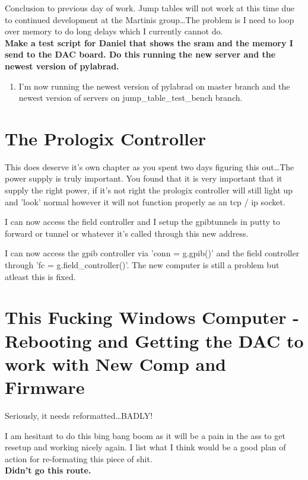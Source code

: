 \documentclass[10pt]{book}
\begin{document}
Conclusion to previous day of work. Jump tables will not work at this time due to continued development at the Martinis group\ldots The problem is I need to loop over memory to do long delays which I currently cannot do. \\

{\bf Make a test script for Daniel that shows the sram and the memory I send to the DAC board. Do this running the new server and the newest version of pylabrad.}


\begin{enumerate}
    \item I'm now running the newest version of pylabrad on master branch and the newest version of servers on jump\_table\_test\_bench branch.
\end{enumerate}


\chapter{The Prologix Controller}

This does deserve it's own chapter as you spent two days figuring this out\ldots The power supply is truly important. You found that it is very important that it supply the right power, if it's not right the prologix controller will still light up and 'look' normal however it will not function properly as an tcp / ip socket.

I can now access the field controller and I setup the gpibtunnels in putty to forward or tunnel or whatever it's called through this new address. 

I can now access the gpib controller via 'conn = g.gpib()' and the field controller through 'fc = g.field\_controller()'. The new computer is still a problem but atleast this is fixed.


\chapter{This Fucking Windows Computer - Rebooting and Getting the DAC to work with New Comp and Firmware}
Seriously, it needs reformatted\ldots BADLY! 

I am hesitant to do this bing bang boom as it will be a pain in the ass to get resetup and working nicely again. I list what I think would be a good plan of action for re-formating this piece of shit.\\

{\bf Didn't go this route.}
\end{document}
